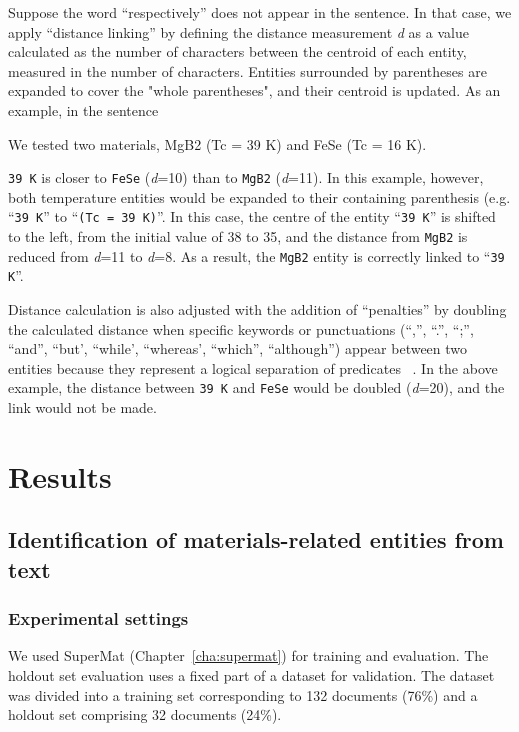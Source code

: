 Suppose the word ``respectively'' does not appear in the sentence. In that case, we apply ``distance linking'' by defining the distance measurement \textit{d} as a value calculated as the number of characters between the centroid of each entity, measured in the number of characters.
Entities surrounded by parentheses are expanded to cover the "whole parentheses", and their centroid is updated.
As an example, in the sentence
\begin{displayquote}
    We tested two materials, MgB2 (Tc = 39 K) and FeSe (Tc = 16 K).
\end{displayquote}

\texttt{39 K} is closer to \texttt{FeSe} (\textit{d}=10) than to \texttt{MgB2} (\textit{d}=11). 
In this example, however, both temperature entities would be expanded to their containing parenthesis (e.g. ``\texttt{39 K}'' to ``\texttt{(Tc = 39 K)}''. 
In this case, the centre of the entity ``\texttt{39 K}'' is shifted to the left, from the initial value of 38 to 35, and the distance from \texttt{MgB2} is reduced from \textit{d}=11 to \textit{d}=8.
As a result, the \texttt{MgB2} entity is correctly linked to ``\texttt{39 K}''.

Distance calculation is also adjusted with the addition of ``penalties'' by doubling the calculated distance when specific keywords or punctuations (``,'', ``.'', ``;'', ``and'', ``but', ``while', ``whereas', ``which'', ``although'') appear between two entities because they represent a logical separation of predicates ~\cite{oka2021table}.
In the above example, the distance between \texttt{39 K} and \texttt{FeSe} would be doubled (\textit{d}=20), and the link would not be made.

\section{Results}

\subsection{Identification of materials-related entities from text}
\subsubsection{Experimental settings}

We used SuperMat (Chapter~\ref{cha:supermat}) for training and evaluation. The holdout set evaluation uses a fixed part of a dataset for validation. 
The dataset was divided into a training set corresponding to 132 documents (76\%) and a holdout set comprising 32 documents (24\%). 

